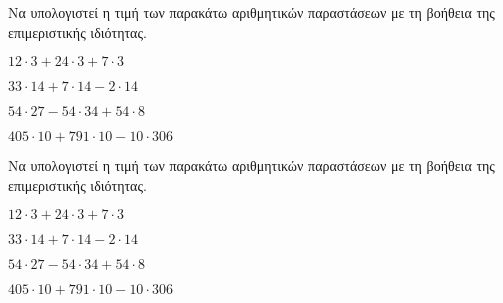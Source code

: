 Να υπολογιστεί η τιμή των παρακάτω αριθμητικών παραστάσεων με τη βοήθεια της επιμεριστικής ιδιότητας.
\begin{rlist}
\item $ 12\cdot3+24\cdot3+7\cdot3 $
\item $ 33\cdot14+7\cdot14-2\cdot14 $
\item $ 54\cdot27-54\cdot34+54\cdot8 $
\item $ 405\cdot10+791\cdot10-10\cdot306 $
\end{rlist}
Να υπολογιστεί η τιμή των παρακάτω αριθμητικών παραστάσεων με τη βοήθεια της επιμεριστικής ιδιότητας.
\begin{rlist}
\item $ 12\cdot3+24\cdot3+7\cdot3 $
\item $ 33\cdot14+7\cdot14-2\cdot14 $
\item $ 54\cdot27-54\cdot34+54\cdot8 $
\item $ 405\cdot10+791\cdot10-10\cdot306 $
\end{rlist}
